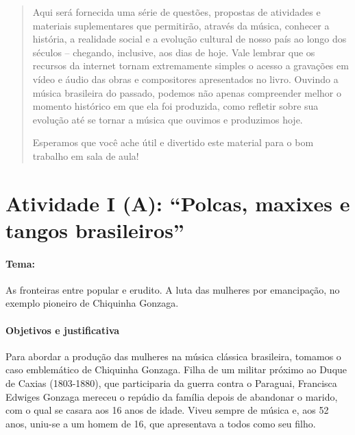 \documentclass[11pt]{extarticle}
\begin{document}
\begin{abstract}
Aqui será fornecida uma série de questões, propostas de atividades e
materiais suplementares que permitirão, através da música, conhecer a
história, a realidade social e a evolução cultural de nosso país ao
longo dos séculos -- chegando, inclusive, aos dias de hoje. Vale lembrar
que os recursos da internet tornam extremamente simples o acesso a
gravações em vídeo e áudio das obras e compositores apresentados no
livro. Ouvindo a música brasileira do passado, podemos não apenas
compreender melhor o momento histórico em que ela foi produzida, como
refletir sobre sua evolução até se tornar a música que ouvimos e
produzimos hoje.

Esperamos que você ache útil e divertido este material para o bom
trabalho em sala de aula!

\end{abstract}

\tableofcontents


\section{Atividade I (A): ``Polcas, maxixes e tangos brasileiros''}

\paragraph{Tema:} As fronteiras entre popular e erudito. A luta das
mulheres por emancipação, no exemplo pioneiro de Chiquinha Gonzaga.



\paragraph{Objetivos e justificativa}

Para abordar a produção das mulheres na música clássica brasileira,
tomamos o caso emblemático de Chiquinha Gonzaga. Filha de um militar
próximo ao Duque de Caxias (1803-1880), que participaria da guerra
contra o Paraguai, Francisca Edwiges Gonzaga mereceu o repúdio da
família depois de abandonar o marido, com o qual se casara aos 16 anos
de idade. Viveu sempre de música e, aos 52 anos, uniu-se a um homem de
16, que apresentava a todos como seu filho.
\end{document}
